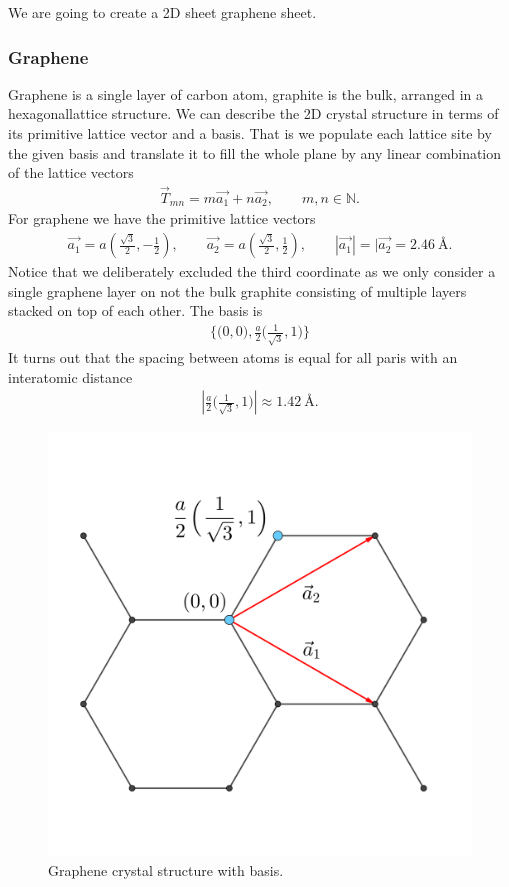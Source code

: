 We are going to create a 2D sheet graphene sheet. 

\subsubsection{Graphene}

Graphene is a single layer of carbon atom, graphite is the bulk, arranged in a hexagonallattice structure. We can describe the 2D crystal
structure in terms of its primitive lattice vector and a basis. That is we populate each lattice site by the given basis and translate it to
fill the whole plane by any linear combination of the lattice vectors
\begin{align*}
  \vec{T}_{mn} = m\vec{a_1} + n\vec{a_2}, \qquad m,n \in \mathbb{N}.
\end{align*}
For graphene we have the primitive lattice vectors 
\begin{align*}
  \vec{a_1} = a \left(\frac{\sqrt{3}}{2}, -\frac{1}{2}\right), \qquad \vec{a_2} = a \left(\frac{\sqrt{3}}{2}, \frac{1}{2}\right), \qquad |\vec{a_1}| = |\vec{a_2} = 2.46 \ \text{Å}.
\end{align*}
Notice that we deliberately excluded the third coordinate as we only consider a single graphene layer on not the bulk graphite consisting of
multiple layers stacked on top of each other. The basis is 
\begin{align*}
  \Big\{\Big(0,0\Big), \frac{a}{2}\Big(\frac{1}{\sqrt{3}}, 1 \Big) \Big\}
\end{align*}
It turns out that the spacing between atoms is equal for all paris with an interatomic distance 
\begin{align*}
  \left|\frac{a}{2}\Big(\frac{1}{\sqrt{3}}, 1 \Big)\right| \approx 1.42 \ \text{Å}.
\end{align*}


\begin{figure}[H]
  \centering
  \includegraphics[width=0.3\linewidth]{figures/crystal.png}
  \caption{Graphene crystal structure with basis.}
  \label{fig:graphene_crystal}
\end{figure}



